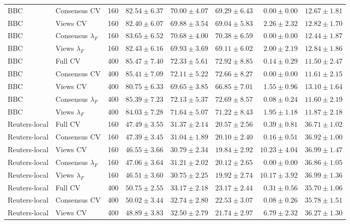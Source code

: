 \begin{longtable}{llrrrrrr}
BBC & Consensus CV & 160 & $82.54\pm6.37$ & $70.00\pm4.07$ & $69.29\pm6.43$ & $0.00\pm0.00$ & $12.67\pm1.81$\\
BBC & Views CV & 160 & $82.40\pm6.07$ & $69.88\pm3.54$ & $69.04\pm5.83$ & $2.26\pm2.32$ & $12.82\pm1.70$\\
BBC & Consensus $\lambda_F$ & 160 & $83.65\pm6.52$ & $70.68\pm4.00$ & $70.38\pm6.59$ & $0.00\pm0.00$ & $12.44\pm1.87$\\
BBC & Views $\lambda_F$ & 160 & $82.43\pm6.16$ & $69.93\pm3.69$ & $69.11\pm6.02$ & $2.00\pm2.19$ & $12.84\pm1.86$\\
BBC & Full CV & 400 & $85.47\pm7.40$ & $72.33\pm5.61$ & $72.92\pm8.85$ & $0.14\pm0.29$ & $11.50\pm2.47$\\
BBC & Consensus CV & 400 & $85.41\pm7.09$ & $72.11\pm5.22$ & $72.66\pm8.27$ & $0.00\pm0.00$ & $11.61\pm2.15$\\
BBC & Views CV & 400 & $80.75\pm6.33$ & $69.65\pm3.85$ & $66.85\pm7.01$ & $1.55\pm0.96$ & $13.10\pm1.64$\\
BBC & Consensus $\lambda_F$ & 400 & $85.39\pm7.23$ & $72.13\pm5.37$ & $72.69\pm8.57$ & $0.08\pm0.24$ & $11.60\pm2.19$\\
BBC & Views $\lambda_F$ & 400 & $84.03\pm7.28$ & $71.64\pm5.07$ & $71.22\pm8.43$ & $1.95\pm1.18$ & $11.87\pm2.18$\\
Reuters-local & Full CV & 160 & $47.49\pm3.55$ & $31.37\pm2.14$ & $20.57\pm2.56$ & $0.39\pm0.81$ & $36.71\pm1.02$\\
Reuters-local & Consensus CV & 160 & $47.39\pm3.45$ & $31.04\pm1.89$ & $20.10\pm2.40$ & $0.16\pm0.51$ & $36.92\pm1.00$\\
Reuters-local & Views CV & 160 & $46.55\pm3.66$ & $30.79\pm2.34$ & $19.84\pm2.92$ & $10.23\pm4.04$ & $36.99\pm1.47$\\
Reuters-local & Consensus $\lambda_F$ & 160 & $47.06\pm3.64$ & $31.21\pm2.02$ & $20.12\pm2.65$ & $0.00\pm0.00$ & $36.86\pm1.05$\\
Reuters-local & Views $\lambda_F$ & 160 & $46.51\pm3.60$ & $30.75\pm2.25$ & $19.92\pm2.74$ & $10.17\pm3.92$ & $36.99\pm1.36$\\
Reuters-local & Full CV & 400 & $50.75\pm2.55$ & $33.17\pm2.18$ & $23.17\pm2.44$ & $0.31\pm0.56$ & $35.70\pm1.06$\\
Reuters-local & Consensus CV & 400 & $50.02\pm3.44$ & $32.74\pm2.80$ & $22.53\pm3.07$ & $0.08\pm0.26$ & $35.78\pm1.51$\\
Reuters-local & Views CV & 400 & $48.89\pm3.83$ & $32.50\pm2.79$ & $21.74\pm2.97$ & $6.79\pm2.32$ & $36.27\pm1.30$\\

\end{longtable}
